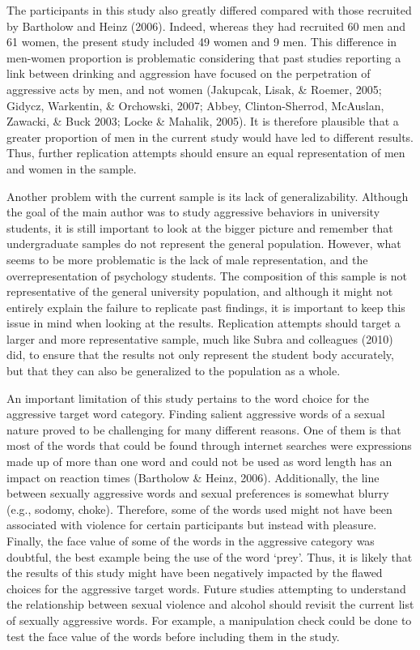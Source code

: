 \documentclass[authordate, serif, review]{jote-article}
\begin{document}
\begin{multicols}{2}
The participants in this study also greatly differed compared with those recruited by Bartholow and Heinz (2006). Indeed, whereas they had recruited 60 men and 61 women, the present study included 49 women and 9 men. This difference in men-women proportion is problematic considering that past studies reporting a link between drinking and aggression have focused on the perpetration of aggressive acts by men, and not women (Jakupcak, Lisak, \& Roemer, 2005; Gidycz, Warkentin, \& Orchowski, 2007; Abbey, Clinton-Sherrod, McAuslan, Zawacki, \& Buck 2003; Locke \& Mahalik, 2005). It is therefore plausible that a greater proportion of men in the current study would have led to different results. Thus, further replication attempts should ensure an equal representation of men and women in the sample.

Another problem with the current sample is its lack of generalizability. Although the goal of the main author was to study aggressive behaviors in university students, it is still important to look at the bigger picture and remember that undergraduate samples do not represent the general population. However, what seems to be more problematic is the lack of male representation, and the overrepresentation of psychology students. The composition of this sample is not representative of the general university population, and although it might not entirely explain the failure to replicate past findings, it is important to keep this issue in mind when looking at the results. Replication attempts should target a larger and more representative sample, much like Subra and colleagues (2010) did, to ensure that the results not only represent the student body accurately, but that they can also be generalized to the population as a whole. 

 An important limitation of this study pertains to the word choice for the aggressive target word category. Finding salient aggressive words of a sexual nature proved to be challenging for many different reasons. One of them is that most of the words that could be found through internet searches were expressions made up of more than one word and could not be used as word length has an impact on reaction times (Bartholow \& Heinz, 2006). Additionally, the line between sexually aggressive words and sexual preferences is somewhat blurry (e.g., sodomy, choke). Therefore, some of the words used might not have been associated with violence for certain participants but instead with pleasure. Finally, the face value of some of the words in the aggressive category was doubtful, the best example being the use of the word `prey'. Thus, it is likely that the results of this study might have been negatively impacted by the flawed choices for the aggressive target words. Future studies attempting to understand the relationship between sexual violence and alcohol should revisit the current list of sexually aggressive words. For example, a manipulation check could be done to test the face value of the words before including them in the study.


\end{multicols}
\end{document}
